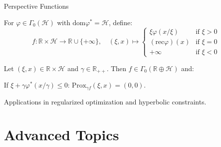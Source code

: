 \documentclass[aspectratio=169,10pt]{beamer}
\begin{document}
\begin{frame}{Perspective Functions}
\begin{definition}
For $\varphi \in \Gamma_0(\mathcal{H})$ with $\mathrm{dom} \varphi^* = \mathcal{H}$, define:
\[
f: \mathbb{R} \times \mathcal{H} \to \mathbb{R} \cup \{+\infty\}, \quad (\xi, x) \mapsto \begin{cases}
\xi \varphi(x/\xi) & \text{if } \xi > 0 \\
(\mathrm{rec} \varphi)(x) & \text{if } \xi = 0 \\
+\infty & \text{if } \xi < 0
\end{cases}
\]
\end{definition}

\vspace{0.3cm}

\begin{theorem}
Let $(\xi, x) \in \mathbb{R} \times \mathcal{H}$ and $\gamma \in \mathbb{R}_{++}$. Then $f \in \Gamma_0(\mathbb{R} \oplus \mathcal{H})$ and:

If $\xi + \gamma\varphi^*(x/\gamma) \leq 0$: $\mathrm{Prox}_{\gamma f}(\xi, x) = (0, 0)$.
\end{theorem}

\vspace{0.3cm}

Applications in regularized optimization and hyperbolic constraints.
\end{frame}

\section{Advanced Topics}
\end{document}
